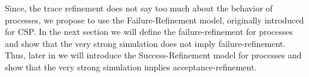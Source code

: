 Since, the trace refinement does not say too much about the behavior of processes, we propose to use the Failure-Refinement model, originally introduced for CSP. In the next section we will define the failure-refinement for \picalc{} processes and show that the very strong simulation does not imply failure-refinement. Thus, later in  we will introduce the Success-Refinement model for \picalc{} processes and show that the very strong simulation implies acceptance-refinement.